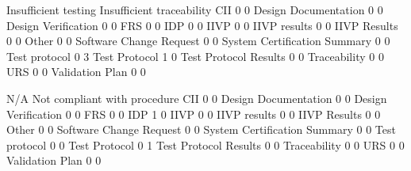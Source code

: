 \documentclass{article}
\begin{document}
\begin{Schunk}
\begin{Soutput}
                               Insufficient testing Insufficient traceability
  CII                                             0                         0
  Design Documentation                            0                         0
  Design Verification                             0                         0
  FRS                                             0                         0
  IDP                                             0                         0
  IIVP                                            0                         0
  IIVP results                                    0                         0
  IIVP Results                                    0                         0
  Other                                           0                         0
  Software Change Request                         0                         0
  System Certification Summary                    0                         0
  Test protocol                                   0                         3
  Test Protocol                                   1                         0
  Test Protocol Results                           0                         0
  Traceability                                    0                         0
  URS                                             0                         0
  Validation Plan                                 0                         0
                              
                               N/A Not compliant with procedure
  CII                            0                            0
  Design Documentation           0                            0
  Design Verification            0                            0
  FRS                            0                            0
  IDP                            1                            0
  IIVP                           0                            0
  IIVP results                   0                            0
  IIVP Results                   0                            0
  Other                          0                            0
  Software Change Request        0                            0
  System Certification Summary   0                            0
  Test protocol                  0                            0
  Test Protocol                  0                            1
  Test Protocol Results          0                            0
  Traceability                   0                            0
  URS                            0                            0
  Validation Plan                0                            0
                              

\end{Soutput}
\end{Schunk}
\end{document}

